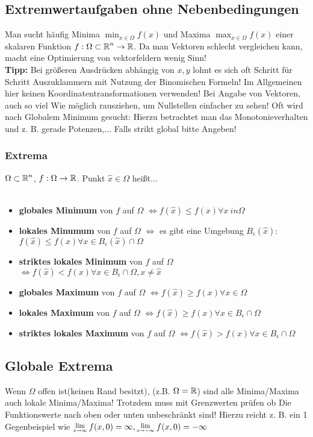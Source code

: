 \documentclass[german]{latex4ei/latex4ei_sheet}
\begin{document}
\subsection{Extremwertaufgaben ohne Nebenbedingungen}
Man sucht h\"aufig Minima $\min_{x \in \Omega} f(x)$ und Maxima $\max_{x \in \Omega} f(x)$  einer skalaren Funktion $f: \Omega \subset \operatorname{\mathbb R}^n \to \operatorname{\mathbb R}$. Da man Vektoren schlecht vergleichen kann, macht eine Optimierung von vektorfeldern wenig Sinn!\\
\textbf{Tipp:} Bei gr\"o\ss{}eren Ausdr\"ucken abh\"angig von $x,y$ lohnt es sich oft Schritt f\"ur Schritt Auszuklammern mit Nutzung der Binomischen Formeln! Im Allgemeinen hier keinen Koordinatentransformationen verwenden! Bei Angabe von Vektoren, auch so viel Wie m\"oglich rausziehen, um Nullstellen einfacher zu sehen! Oft wird nach Globalem Minimum gesucht: Hierzu betrachtet man das Monotonieverhalten und z. B. gerade Potenzen,... Falls strikt global bitte Angeben!\\

\subsubsection{Extrema}
$\Omega \subset \operatorname{\mathbb R}^n$, $f: \Omega \to \operatorname{\mathbb R}$. Punkt $\hat{x} \in \Omega$ hei\ss{}t...\\\
\begin{itemize}
\item \textbf{globales Minimum} von $f$ auf $\Omega$ $\Leftrightarrow f(\hat{x})\le f(x) \forall x\ in \Omega$ 
\item \textbf{lokales Minumum} von $f$ auf $\Omega$  $\Leftrightarrow$ es gibt eine Umgebung $B_\epsilon(\hat{x})$: $f(\hat{x}) \le f(x) \forall x \in B_\epsilon(\hat{x}) \cap \Omega$
\item \textbf{striktes lokales Minimum} von $f$ auf $\Omega$  $\Leftrightarrow f(\hat{x}) < f(x) \forall x \in B_\epsilon \cap \Omega, x \neq \hat{x}$ 
\item \textbf{globales Maximum} von $f$ auf $\Omega$  $\Leftrightarrow f(\hat{x}) \ge f(x) \forall x \in \Omega$
\item \textbf{lokales Maximum} von $f$ auf $\Omega$  $\Leftrightarrow f(\hat{x}) \ge f(x) \forall x\in B_\epsilon \cap \Omega$ 
\item \textbf{striktes lokales Maximum} von $f$ auf $\Omega$  $\Leftrightarrow f(\hat{x}) > f(x) \forall x \in B_\epsilon \cap \Omega$
\end{itemize}

\subsection{Globale Extrema}
Wenn $\Omega$ offen ist(keinen Rand besitzt), (z.B. $\Omega=\operatorname{\mathbb R}$) sind alle Minima/Maxima auch lokale Minima/Maxima! 
Trotzdem muss mit Grenzwerten pr\"ufen ob Die Funktionswerte nach oben oder unten unbeschr\"ankt sind! Hierzu reicht z. B. ein 1 Gegenbeispiel wie $\Lim{x\to \infty}f(x,0)=\infty,\Lim{x\to-\infty}f(x,0)=-\infty$
\end{document}
